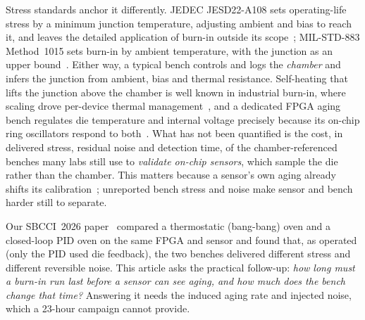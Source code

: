 \documentclass[10pt,twocolumn]{article}
\begin{document}
Stress standards anchor it differently. JEDEC JESD22-A108 sets operating-life stress by a minimum junction temperature, adjusting ambient and bias to reach it, and leaves the detailed application of burn-in outside its scope~\cite{jedec}; MIL-STD-883 Method~1015 sets burn-in by ambient temperature, with the junction as an upper bound~\cite{mil}. Either way, a typical bench controls and logs the \emph{chamber} and infers the junction from ambient, bias and thermal resistance. Self-heating that lifts the junction above the chamber is well known in industrial burn-in, where scaling drove per-device thermal management~\cite{semenov}, and a dedicated FPGA aging bench regulates die temperature and internal voltage precisely because its on-chip ring oscillators respond to both~\cite{sobas}. What has not been quantified is the cost, in delivered stress, residual noise and detection time, of the chamber-referenced benches many labs still use to \emph{validate on-chip sensors}, which sample the die rather than the chamber. This matters because a sensor's own aging already shifts its calibration~\cite{anik}; unreported bench stress and noise make sensor and bench harder still to separate.

Our SBCCI~2026 paper~\cite{sbcci26} compared a thermostatic (bang-bang) oven and a closed-loop PID oven on the same FPGA and sensor and found that, as operated (only the PID used die feedback), the two benches delivered different stress and different reversible noise. This article asks the practical follow-up: \emph{how long must a burn-in run last before a sensor can see aging, and how much does the bench change that time?} Answering it needs the induced aging rate and injected noise, which a 23-hour campaign cannot provide.
\end{document}
